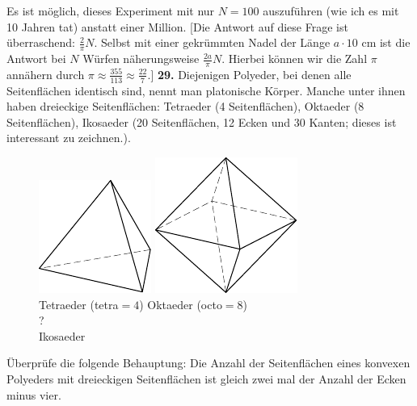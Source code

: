 \documentclass[12pt]{article} %
\begin{document}
Es ist möglich, dieses Experiment mit nur $N=100$ auszuführen (wie ich es mit 10 Jahren tat) anstatt einer Million. [Die Antwort auf diese Frage ist überraschend: $\frac2{\pi}N$. Selbst mit einer gekrümmten Nadel der Länge $a \cdot 10$ cm ist die Antwort bei $N$ Würfen näherungsweise $\frac{2a}{\pi}N$. 
Hierbei können wir die Zahl $\pi$ annähern durch $\pi \approx \frac{355}{113} \approx \frac{22}7.$]
\newline\newline\quad
{\bf 29.} Diejenigen Polyeder, bei denen alle Seitenflächen identisch sind, nennt man platonische Körper. Manche unter ihnen haben dreieckige Seitenflächen: Tetraeder (4 Seitenflächen), Oktaeder (8 Seitenflächen), Ikosaeder (20 Seitenflächen, 12 Ecken und 30 Kanten; dieses ist interessant zu zeichnen.). 
\begin{figure}[h!]
\centering
\footnotesize
\hspace{5pt}
\includegraphics[scale=1]{taskbook-131}\hspace{68pt}
\includegraphics[scale=1]{taskbook-132}\\ \vspace{3pt}
Tetraeder (tetra${}= 4$) \hspace{40pt}
Oktaeder (octo${}= 8$)\\[25pt]
{\Huge 
?}\\ Ikosaeder\vspace{3pt}
\end{figure}
Überprüfe die folgende Behauptung: Die Anzahl der Seitenflächen eines konvexen Polyeders mit dreieckigen Seitenflächen ist gleich zwei mal der Anzahl der Ecken minus vier. 
\newpage
\end{document}
